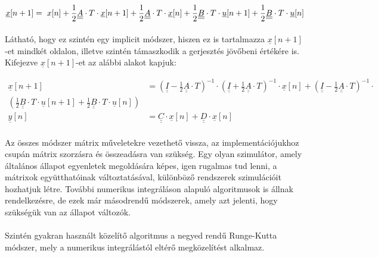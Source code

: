 \begin{equation}
\underline{x}[n + 1] = \ x[n] + \frac{1}{2}\underline{\underline{A}} \cdot T \cdot \underline{x}[n + 1] + \frac{1}{2}\underline{\underline{A}}\cdot{}T\cdot{}\underline{x}[n] + \frac{1}{2}\underline{\underline{B}} \cdot T \cdot \underline{u}[n + 1] + \frac{1}{2}\underline{\underline{B}}\cdot{}T\cdot{}\underline{u}[n] \\[0.3em]
\end{equation}

\paragraph{}
Látható, hogy ez szintén egy implicit módszer, hiszen ez is tartalmazza $\underline{x}[n+1]$-et mindkét oldalon, illetve szintén támaszkodik a gerjesztés jövőbeni értékére is. Kifejezve $\underline{x}[n+1]$-et az alábbi alakot kapjuk:

\begin{equation}
\begin{align*}
\underline{x}[n + 1] &= (\underline{\underline{I}} - \frac{1}{2}\underline{\underline{A}} \cdot T )^{-1} \cdot{} (\underline{\underline{I}} + \frac{1}{2}\underline{\underline{A}} \cdot T )^{-1} \cdot{} \underline{x}[n] + (\underline{\underline{I}} - \frac{1}{2}\underline{\underline{A}} \cdot T)^{-1} \cdot{} \\ (\frac{1}{2}\underline{\underline{B}} \cdot{} T \cdot{} \underline{u}[n+1] + \frac{1}{2}\underline{\underline{B}} \cdot{} T \cdot{} \underline{u}[n])  \\[0.3em]
\underline{y}[n] &= \underline{\underline{C}}\cdot \underline{x}[n] + \underline{\underline{D}}\cdot{}\underline{x}[n]
\end{align*} 
\end{equation}

\paragraph{}
Az összes módszer mátrix műveletekre vezethető vissza, az implementációjukhoz csupán mátrix szorzásra és összeadásra van szükség. Egy olyan szimulátor, amely általános állapot egyenletek megoldására képes, igen rugalmas tud lenni, a mátrixok együtthatóinak változtatásával, különböző rendszerek szimulációit hozhatjuk létre. További numerikus integráláson alapuló algoritmusok is állnak rendelkezésre, de ezek már másodrendű módszerek, amely azt jelenti, hogy szükségük van az állapot változók.
\paragraph{}
Szintén gyakran használt közelítő algoritmus a negyed rendű Runge-Kutta módszer, mely a numerikus integrálástól eltérő megközelítést alkalmaz.

